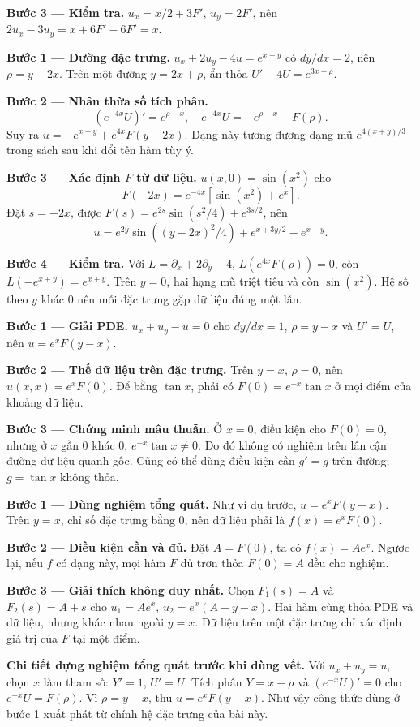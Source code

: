 \textbf{Bước 3 — Kiểm tra.} $u_x=x/2+3F'$, $u_y=2F'$, nên $2u_x-3u_y=x+6F'-6F'=x$.

\textbf{Bước 1 — Đường đặc trưng.} $u_x+2u_y-4u=e^{x+y}$ có $dy/dx=2$, nên $\rho=y-2x$. Trên một đường $y=2x+\rho$, ẩn thỏa $U'-4U=e^{3x+\rho}$.

\textbf{Bước 2 — Nhân thừa số tích phân.}
\[(e^{-4x}U)'=e^{\rho-x},\quad e^{-4x}U=-e^{\rho-x}+F(\rho).\]
Suy ra $u=-e^{x+y}+e^{4x}F(y-2x)$. Dạng này tương đương dạng mũ $e^{4(x+y)/3}$ trong sách sau khi đổi tên hàm tùy ý.

\textbf{Bước 3 — Xác định $F$ từ dữ liệu.} $u(x,0)=\sin(x^2)$ cho
\[F(-2x)=e^{-4x}[\sin(x^2)+e^x].\]
Đặt $s=-2x$, được $F(s)=e^{2s}\sin(s^2/4)+e^{3s/2}$, nên
\[u=e^{2y}\sin((y-2x)^2/4)+e^{x+3y/2}-e^{x+y}.\]

\textbf{Bước 4 — Kiểm tra.} Với $L=\partial_x+2\partial_y-4$, $L(e^{4x}F(\rho))=0$, còn $L(-e^{x+y})=e^{x+y}$. Trên $y=0$, hai hạng mũ triệt tiêu và còn $\sin(x^2)$. Hệ số theo $y$ khác 0 nên mỗi đặc trưng gặp dữ liệu đúng một lần.

\textbf{Bước 1 — Giải PDE.} $u_x+u_y-u=0$ cho $dy/dx=1$, $\rho=y-x$ và $U'=U$, nên $u=e^xF(y-x)$.

\textbf{Bước 2 — Thế dữ liệu trên đặc trưng.} Trên $y=x$, $\rho=0$, nên $u(x,x)=e^xF(0)$. Để bằng $\tan x$, phải có $F(0)=e^{-x}\tan x$ ở mọi điểm của khoảng dữ liệu.

\textbf{Bước 3 — Chứng minh mâu thuẫn.} Ở $x=0$, điều kiện cho $F(0)=0$, nhưng ở $x$ gần 0 khác 0, $e^{-x}\tan x\ne0$. Do đó không có nghiệm trên lân cận đường dữ liệu quanh gốc. Cũng có thể dùng điều kiện cần $g'=g$ trên đường; $g=\tan x$ không thỏa.

\textbf{Bước 1 — Dùng nghiệm tổng quát.} Như ví dụ trước, $u=e^xF(y-x)$. Trên $y=x$, chỉ số đặc trưng bằng 0, nên dữ liệu phải là $f(x)=e^xF(0)$.

\textbf{Bước 2 — Điều kiện cần và đủ.} Đặt $A=F(0)$, ta có $f(x)=Ae^x$. Ngược lại, nếu $f$ có dạng này, mọi hàm $F$ đủ trơn thỏa $F(0)=A$ đều cho nghiệm.

\textbf{Bước 3 — Giải thích không duy nhất.} Chọn $F_1(s)=A$ và $F_2(s)=A+s$ cho $u_1=Ae^x$, $u_2=e^x(A+y-x)$. Hai hàm cùng thỏa PDE và dữ liệu, nhưng khác nhau ngoài $y=x$. Dữ liệu trên một đặc trưng chỉ xác định giá trị của $F$ tại một điểm.

\textbf{Chi tiết dựng nghiệm tổng quát trước khi dùng vết.} Với $u_x+u_y=u$, chọn $x$ làm tham số: $Y'=1$, $U'=U$. Tích phân $Y=x+\rho$ và $(e^{-x}U)'=0$ cho $e^{-x}U=F(\rho)$. Vì $\rho=y-x$, thu $u=e^xF(y-x)$. Như vậy công thức dùng ở bước 1 xuất phát từ chính hệ đặc trưng của bài này.

